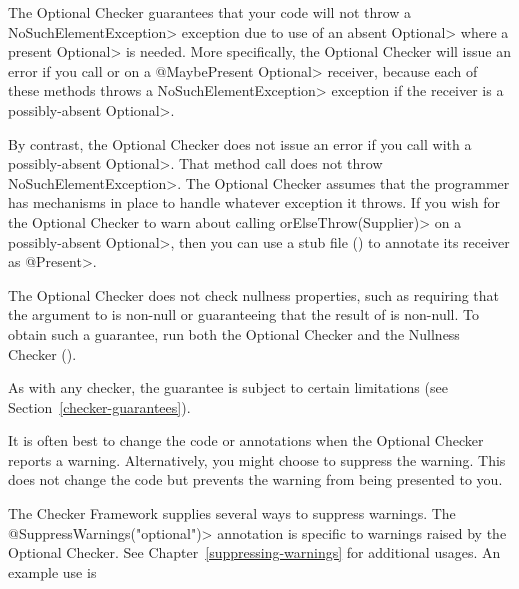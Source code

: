 
The Optional Checker guarantees that your code will not throw a \<NoSuchElementException> exception
due to use of an absent \<Optional> where a present \<Optional> is needed.
More specifically, the Optional Checker will issue an error if you call
or
on a \<@MaybePresent Optional> receiver, because each of these methods
throws a \<NoSuchElementException> exception if the receiver is a possibly-absent
\<Optional>.

By contrast, the Optional Checker does not issue an error if you call
with a possibly-absent \<Optional>.  That method call does not
throw \<NoSuchElementException>.  The Optional Checker assumes that the
programmer has mechanisms in place to handle whatever exception it throws.
If you wish for the Optional Checker to warn about calling
\<orElseThrow(Supplier)> on a possibly-absent \<Optional>, then you can use
a stub file () to annotate its receiver as \<@Present>.

The Optional Checker does not check nullness properties, such as requiring
that the argument to
is non-null or guaranteeing that the result of
is non-null.  To obtain such a guarantee, run both the Optional Checker and
the Nullness Checker ().

As with any checker, the guarantee is subject to certain limitations (see
Section~\ref{checker-guarantees}).


It is often best to change the code or annotations when the Optional Checker
reports a warning.
Alternatively, you might choose to suppress the warning.
This does not change the code but prevents the warning from being presented to
you.

\begin{sloppypar}
The Checker Framework supplies several ways to suppress warnings.
The \<@SuppressWarnings("optional")> annotation is specific to warnings raised
by the Optional Checker.
See Chapter~\ref{suppressing-warnings} for additional usages.
An example use is
\end{sloppypar}

